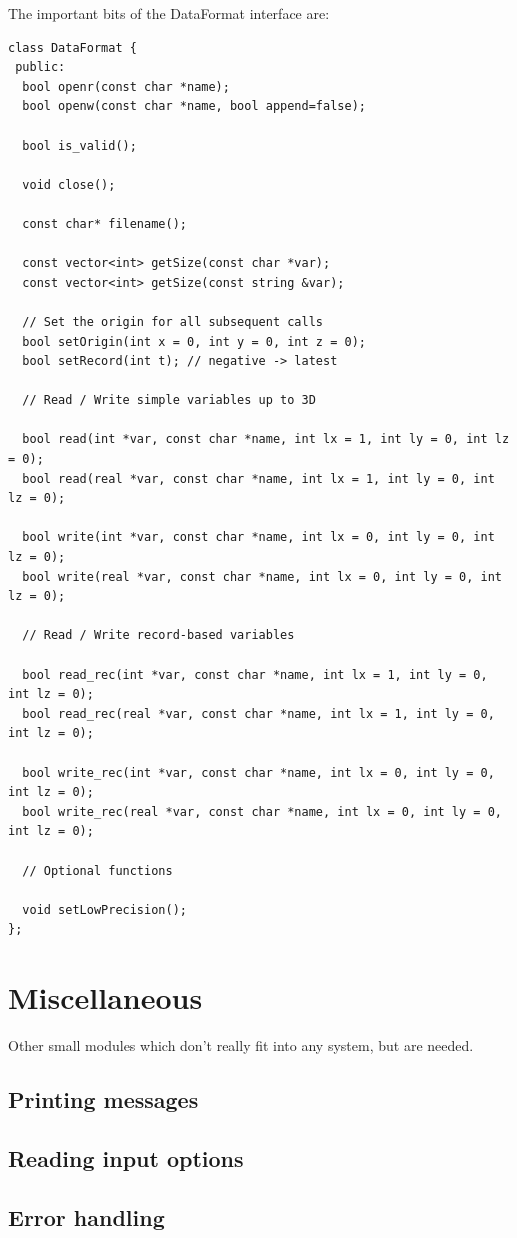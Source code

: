 \documentclass[12pt]{article}
\begin{document}
The important bits of the DataFormat interface are:
\begin{lstlisting}
class DataFormat {
 public:
  bool openr(const char *name);
  bool openw(const char *name, bool append=false);
  
  bool is_valid();
  
  void close();
  
  const char* filename();

  const vector<int> getSize(const char *var);
  const vector<int> getSize(const string &var);

  // Set the origin for all subsequent calls
  bool setOrigin(int x = 0, int y = 0, int z = 0); 
  bool setRecord(int t); // negative -> latest
  
  // Read / Write simple variables up to 3D

  bool read(int *var, const char *name, int lx = 1, int ly = 0, int lz = 0);
  bool read(real *var, const char *name, int lx = 1, int ly = 0, int lz = 0);

  bool write(int *var, const char *name, int lx = 0, int ly = 0, int lz = 0);
  bool write(real *var, const char *name, int lx = 0, int ly = 0, int lz = 0);

  // Read / Write record-based variables

  bool read_rec(int *var, const char *name, int lx = 1, int ly = 0, int lz = 0);
  bool read_rec(real *var, const char *name, int lx = 1, int ly = 0, int lz = 0);

  bool write_rec(int *var, const char *name, int lx = 0, int ly = 0, int lz = 0);
  bool write_rec(real *var, const char *name, int lx = 0, int ly = 0, int lz = 0);

  // Optional functions
  
  void setLowPrecision();
};
\end{lstlisting}

\section{Miscellaneous}

Other small modules which don't really fit into any system, but are needed.


\subsection{Printing messages}



\subsection{Reading input options}



\subsection{Error handling}
\end{document}

